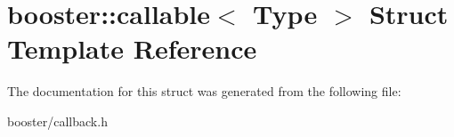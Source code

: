 \section{booster\-:\-:callable$<$ Type $>$ Struct Template Reference}
\label{structbooster_1_1callable}


The documentation for this struct was generated from the following file\-:\begin{DoxyCompactItemize}
\item 
booster/callback.\-h\end{DoxyCompactItemize}
